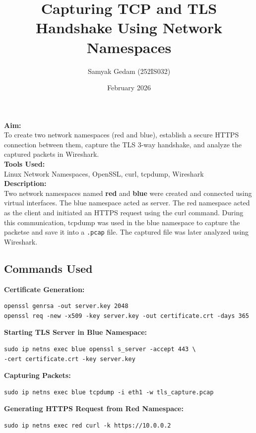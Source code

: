 \documentclass[12pt]{article}
\title{Capturing TCP and TLS Handshake Using Network Namespaces}
\author{Samyak Gedam (252IS032)}
\date{February 2026}
\begin{document}
\maketitle

\noindent
\textbf{Aim:}\\
To create two network namespaces (red and blue), establish a secure HTTPS connection between them, capture the TLS 3-way handshake, and analyze the captured packets in Wireshark.\\

\noindent
\textbf{Tools Used:} \\
Linux Network Namespaces,  OpenSSL, curl, tcpdump, Wireshark\\

\noindent
\textbf{Description:}\\
Two network namespaces named \textbf{red} and \textbf{blue} were created and connected using virtual interfaces. The blue namespace acted as server. The red namespace acted as the client and initiated an HTTPS request using the curl command. During this communication, tcpdump was used in the blue namespace to capture the packetse and save it into a \texttt{.pcap} file. The captured file was later analyzed using Wireshark.


\subsection*{Commands Used}
\textbf{Certificate Generation:}
\begin{verbatim}
openssl genrsa -out server.key 2048
openssl req -new -x509 -key server.key -out certificate.crt -days 365
\end{verbatim}

\noindent
\textbf{Starting TLS Server in Blue Namespace:}
\begin{verbatim}
sudo ip netns exec blue openssl s_server -accept 443 \
-cert certificate.crt -key server.key
\end{verbatim}

\noindent
\textbf{Capturing Packets:}
\begin{verbatim}
sudo ip netns exec blue tcpdump -i eth1 -w tls_capture.pcap
\end{verbatim}

\noindent
\textbf{Generating HTTPS Request from Red Namespace:}
\begin{verbatim}
sudo ip netns exec red curl -k https://10.0.0.2
\end{verbatim}
\end{document}
